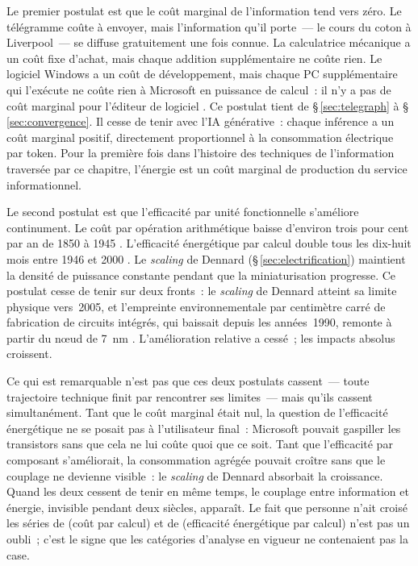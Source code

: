 Le premier postulat est que le coût marginal de l'information tend vers zéro. Le télégramme coûte à envoyer, mais l'information qu'il porte~--- le cours du coton à Liverpool~--- se diffuse gratuitement une fois connue. La calculatrice mécanique a un coût fixe d'achat, mais chaque addition supplémentaire ne coûte rien. Le logiciel Windows a un coût de développement, mais chaque PC supplémentaire qui l'exécute ne coûte rien à Microsoft en puissance de calcul~: il n'y a pas de coût marginal pour l'éditeur de logiciel \parencite{roussilhe_computing_2025}. Ce postulat tient de §\,\ref{sec:telegraph} à §\,\ref{sec:convergence}. Il cesse de tenir avec l'IA générative~: chaque inférence a un coût marginal positif, directement proportionnel à la consommation électrique par token. Pour la première fois dans l'histoire des techniques de l'information traversée par ce chapitre, l'énergie est un coût marginal de production du service informationnel.

Le second postulat est que l'efficacité par unité fonctionnelle s'améliore continument. Le coût par opération arithmétique baisse d'environ trois pour cent par an de 1850 à 1945 \parencite{nordhaus_two_2007}. L'efficacité énergétique par calcul double tous les dix-huit mois entre 1946 et 2000 \parencite{koomey_implications_2011}. Le \emph{scaling} de Dennard (§\,\ref{sec:electrification}) maintient la densité de puissance constante pendant que la miniaturisation progresse. Ce postulat cesse de tenir sur deux fronts~: le \emph{scaling} de Dennard atteint sa limite physique vers~2005, et l'empreinte environnementale par centimètre carré de fabrication de circuits intégrés, qui baissait depuis les années~1990, remonte à partir du n\oe{}ud de 7~nm \parencite{pirson_environmental_2022}. L'amélioration relative a cessé~; les impacts absolus croissent.

Ce qui est remarquable n'est pas que ces deux postulats cassent~--- toute trajectoire technique finit par rencontrer ses limites~--- mais qu'ils cassent simultanément. Tant que le coût marginal était nul, la question de l'efficacité énergétique ne se posait pas à l'utilisateur final~: Microsoft pouvait \og gaspiller les transistors\fg{} \parencite{gilder_coming_1995} sans que cela ne lui coûte quoi que ce soit. Tant que l'efficacité par composant s'améliorait, la consommation agrégée pouvait croître sans que le couplage ne devienne visible~: le \emph{scaling} de Dennard absorbait la croissance. Quand les deux cessent de tenir en même temps, le couplage entre information et énergie, invisible pendant deux siècles, apparaît. Le fait que personne n'ait croisé les séries de \textcite{nordhaus_two_2007} (coût par calcul) et de \textcite{koomey_implications_2011} (efficacité énergétique par calcul) n'est pas un oubli~; c'est le signe que les catégories d'analyse en vigueur ne contenaient pas la case.


